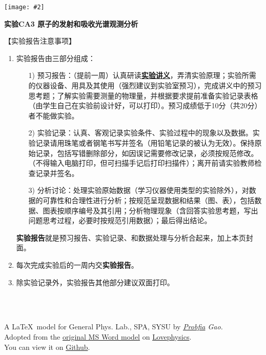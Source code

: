 \documentclass[11pt,a4paper]{ctexart}
\newcommand{\ExpeName}{实验CA3 原子的发射和吸收光谱观测分析}
\newcommand{\cpic}[2]{
\begin{center}
\texttt{[image: \#2]}
\end{center}
}
\begin{document}
\cpic{0.255}{e1}%
\begin{center}
\LARGE\textbf{{\ExpeName}}
\end{center}
\large{【实验报告注意事项】}
\begin{enumerate}
 \item 实验报告由三部分组成：
 \begin{enumerate}
  \item[1)]预习报告：（提前一周）认真研读\textbf{\uline{实验讲义}}，弄清实验原理；实验所需的仪器设备、用具及其使用（强烈建议到实验室预习），完成讲义中的预习思考题；了解实验需要测量的物理量，并根据要求提前准备实验记录表格（由学生自己在实验前设计好，可以打印）。预习成绩低于10分（共20分）者不能做实验。
  \item[2)]实验记录：认真、客观记录实验条件、实验过程中的现象以及数据。实验记录请用珠笔或者钢笔书写并签名（{\color{red}用铅笔记录的被认为无效}）。{\color{red}保持原始记录，包括写错删除部分，如因误记需要修改记录，必须按规范修改。}（不得输入电脑打印，但可扫描手记后打印扫描件）；离开前请实验教师检查记录并签名。
  \item[3)]分析讨论：处理实验原始数据（学习仪器使用类型的实验除外），对数据的可靠性和合理性进行分析；按规范呈现数据和结果（图、表），包括数据、图表按顺序编号及其引用；分析物理现象（含回答实验思考题，写出问题思考过程，必要时按规范引用数据）；最后得出结论。
 \end{enumerate}
 \textbf{实验报告}就是预习报告、实验记录、和数据处理与分析合起来，加上本页封面。
 \item 每次完成实验后的一周内交\textbf{实验报告}。
 \item 除实验记录外，实验报告其他部分建议双面打印。
\end{enumerate}
\ 
\\
\ 

\begin{flushright}                                                           %
\tiny{
A \LaTeX \ model for General Phys. Lab., SPA, SYSU by {\em \href{https://www.weibo.com/3532532974/profile?rightmod=1&wvr=6&mod=personinfo&is_all=1}{Probfia} Gao.}\\ Adopted from the \href{http://lovephysics.sysu.edu.cn/lib/exe/fetch.php?media=courses:secondlevelzhuhai:report.docx}{original MS Word model} on \href{http://lovephysics.sysu.edu.cn}{Lovephysics}.\\ You can view it on \href{https://github.com/Probfia/SYSU_GPL_C}{Github}.}
\end{flushright}
\end{document}
